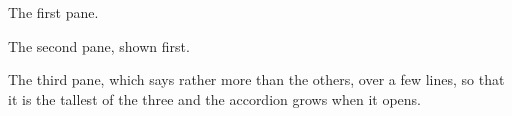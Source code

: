 \begin{webaccordion}[variant=card, motion=fade, --rtx-accent=#c2410c, class=faq, initial=two]
\begin{webpane}[one] The first pane. \webnextpane \end{webpane}
\begin{webpane}[two] The second pane, shown first. \webprevpane[Back] \webnextpane[On] \end{webpane}
\begin{webpane}[three] The third pane, which says rather more than the others,
over a few lines, so that it is the tallest of the three and the accordion
grows when it opens.  \end{webpane}
\end{webaccordion}
